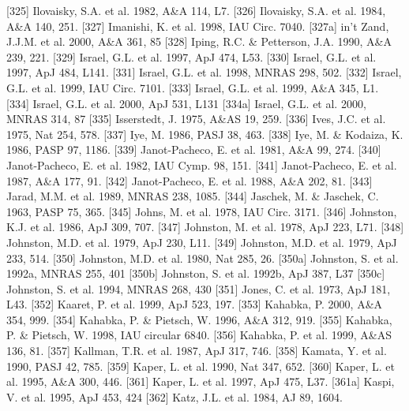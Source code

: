 \documentclass{aa}
\begin{document}
\begin{thebibliography}{}
\bibitem[]{}[325] Ilovaisky, S.A. et al. 1982, A\&A 114, L7.
\bibitem[]{}[326] Ilovaisky, S.A. et al. 1984, A\&A 140, 251.
\bibitem[]{}[327] Imanishi, K. et al. 1998, IAU Circ. 7040.        
\bibitem[]{}[327a] in't Zand, J.J.M. et al. 2000, A\&A 361, 85   
\bibitem[]{}[328] Iping, R.C. \& Petterson, J.A. 1990, A\&A 239, 221.
\bibitem[]{}[329] Israel, G.L. et al. 1997, ApJ 474, L53.             
\bibitem[]{}[330] Israel, G.L. et al. 1997, ApJ 484, L141.
\bibitem[]{}[331] Israel, G.L. et al. 1998, MNRAS 298, 502. 
\bibitem[]{}[332] Israel, G.L. et al. 1999, IAU Circ. 7101.
\bibitem[]{}[333] Israel, G.L. et al. 1999, A\&A 345, L1.
\bibitem[]{}[334] Israel, G.L. et al.  2000, ApJ 531, L131
\bibitem[]{}[334a] Israel, G.L. et al. 2000, MNRAS 314, 87 
\bibitem[]{}[335] Isserstedt, J. 1975, A\&AS 19, 259.
\bibitem[]{}[336] Ives, J.C. et al. 1975, Nat 254, 578.
\bibitem[]{}[337] Iye, M. 1986, PASJ 38, 463.
\bibitem[]{}[338] Iye, M. \& Kodaiza, K. 1986, PASP 97, 1186.
\bibitem[]{}[339] Janot-Pacheco, E. et al. 1981, A\&A 99, 274.
\bibitem[]{}[340] Janot-Pacheco, E. et al. 1982, IAU Cymp. 98, 151.
\bibitem[]{}[341] Janot-Pacheco, E. et al. 1987, A\&A 177, 91.
\bibitem[]{}[342] Janot-Pacheco, E. et al. 1988, A\&A 202, 81.
\bibitem[]{}[343] Jarad, M.M. et al. 1989, MNRAS 238, 1085.
\bibitem[]{}[344] Jaschek, M. \& Jaschek, C. 1963, PASP 75, 365.
\bibitem[]{}[345] Johns, M. et al. 1978, IAU Circ. 3171.
\bibitem[]{}[346] Johnston, K.J. et al. 1986, ApJ 309, 707.
\bibitem[]{}[347] Johnston, M. et al. 1978, ApJ 223, L71.
\bibitem[]{}[348] Johnston, M.D. et al. 1979, ApJ 230, L11.
\bibitem[]{}[349] Johnston, M.D. et al. 1979, ApJ 233, 514.
\bibitem[]{}[350] Johnston, M.D. et al. 1980, Nat 285, 26.
\bibitem[]{}[350a] Johnston, S. et al. 1992a, MNRAS 255, 401
\bibitem[]{}[350b] Johnston, S. et al. 1992b, ApJ 387, L37
\bibitem[]{}[350c] Johnston, S. et al. 1994, MNRAS 268, 430
\bibitem[]{}[351] Jones, C. et al. 1973, ApJ 181, L43.
\bibitem[]{}[352] Kaaret, P. et al. 1999, ApJ 523, 197. 
\bibitem[]{}[353] Kahabka, P. 2000, A\&A 354, 999.
\bibitem[]{}[354] Kahabka, P. \& Pietsch, W. 1996, A\&A 312, 919.
\bibitem[]{}[355] Kahabka, P. \& Pietsch, W. 1998, IAU circular 6840.
\bibitem[]{}[356] Kahabka, P. et al. 1999, A\&AS 136, 81.
\bibitem[]{}[357] Kallman, T.R. et al. 1987, ApJ 317, 746.
\bibitem[]{}[358] Kamata, Y. et al. 1990, PASJ 42, 785.
\bibitem[]{}[359] Kaper, L. et al. 1990, Nat 347, 652.
\bibitem[]{}[360] Kaper, L. et al. 1995, A\&A 300, 446.
\bibitem[]{}[361] Kaper, L. et al. 1997, ApJ 475, L37.
\bibitem[]{}[361a] Kaspi, V. et al. 1995, ApJ 453, 424 
\bibitem[]{}[362] Katz, J.L. et al. 1984, AJ 89, 1604.

\end{thebibliography}
\end{document}

